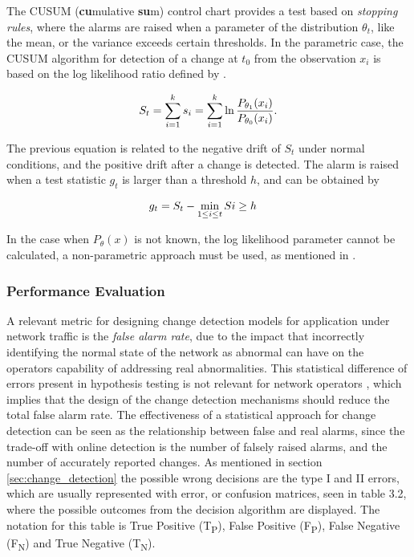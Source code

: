 \par The CUSUM (\textbf{cu}mulative \textbf{su}m) control chart provides a test based on \textit{stopping rules}, where the alarms are raised when a parameter
of the distribution $\theta_t$, like the mean, or the variance exceeds certain thresholds. In the parametric case, the CUSUM algorithm for detection of a change at
$t_0$ from the observation $x_i$ is based on the log likelihood ratio defined by \cite{ahmed_novel_2008}.

\begin{equation*}
\centering
    S_t = \sum_{i=1}^k s_i = \sum_{i=1}^k\ln \frac {P_{\theta_1}(x_i)} {P_{\theta_0}(x_i)}.
\end{equation*}

\par The previous equation is related to the negative drift of $S_t$ under normal conditions, and the positive drift after a change is detected. The alarm is raised 
when a test statistic $g_t$ is larger than a threshold $h$, and can be obtained by 

\begin{equation*}
\centering
    \begin{split}
        &g_t = S_t - \min_{1 \leq i \leq t} Si \geq h
    \end{split}
\end{equation*}

\par In the case when $P_{\theta}(x)$ is not known, the log likelihood parameter cannot be calculated, a non-parametric approach must be used, as mentioned in \cite{
ahmed_novel_2008}.  

\subsubsection {Performance Evaluation} \label{subsec:performance_evaluation}

A relevant metric for designing change detection models for application under network traffic is the \textit{false alarm rate}, due to the impact that incorrectly 
identifying the normal state of the network as abnormal can have on the operators capability of addressing real abnormalities. This statistical difference of errors
present in hypothesis testing is not relevant for network operators \cite{munz_traffic_2010}, which implies that the design of the change detection mechanisms should
reduce the total false alarm rate. 
The effectiveness of a statistical approach for change detection can be seen as the relationship between false and real alarms, since the trade-off with online
detection is the number of falsely raised alarms, and the number of accurately reported changes. As mentioned in section \ref{sec:change_detection} the possible 
wrong decisions are the type I and II errors, which are usually represented with error, or confusion matrices, seen in table 3.2, 
where the possible outcomes from the decision algorithm are displayed. The notation for this table is True Positive (T\textsubscript{P}), False Positive 
(F\textsubscript{P}), False Negative (F\textsubscript{N}) and True Negative (T\textsubscript{N}).

